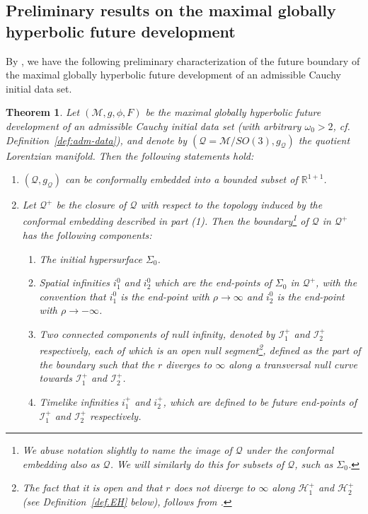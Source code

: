 \documentclass[10pt, reqno]{amsart}
\newtheorem{theorem}{Theorem}[section]
\theoremstyle{definition}
\theoremstyle{remark}
\theoremstyle{conjecture}
\numberwithin{equation}{section}
\newcommand{\0}{\emptyset}
\newcommand{\omg}{\omega}
\newcommand{\calH}{\mathcal H}
\newcommand{\calI}{\mathcal I}
\newcommand{\calM}{\mathcal M}
\newcommand{\calQ}{\mathcal Q}
\newcommand{\EH}{\calH^{+}}
\newcommand{\NI}{\calI^{+}}						%
\begin{document}
\subsection{Preliminary results on the maximal globally hyperbolic future development}\label{sec:MGHFD.prelim}
By \cite{Kommemi, D3}, we have the following preliminary characterization of the future boundary of the maximal globally hyperbolic future development of an admissible Cauchy initial data set.
\begin{theorem} \label{thm:kommemi}
Let $(\calM, g, \phi, F)$ be the maximal globally hyperbolic future development of an admissible Cauchy initial data set (with arbitrary $\omg_{0}>2$, cf. Definition~\ref{def:adm-data}), and denote by $(\calQ = \calM / SO(3), g_{\calQ})$ the quotient Lorentzian manifold. Then the following statements hold:
\begin{enumerate}
\item $(\mathcal Q,g_{\mathcal Q})$ can be conformally embedded into a bounded subset of $\mathbb R^{1+1}$. 
\item Let $\mathcal Q^+$ be the closure of $\mathcal Q$ with respect to the topology induced by the conformal embedding described in part (1). Then the boundary\footnote{We abuse notation slightly to name the image of $\mathcal Q$ under the conformal embedding also as $\mathcal Q$. We will similarly do this for subsets of $\mathcal Q$, such as $\Sigma_{0}$.} of $\mathcal Q$ in $\mathcal Q^+$ has the following components: 
\begin{enumerate}
\item The initial hypersurface $\Sigma_{0}$.
\item Spatial infinities $i^0_1$ and $i^0_2$ which are the end-points of $\Sigma_{0}$ in $\mathcal Q^+$, with the convention that $i^0_1$ is the end-point with $\rho\to \infty$ and $i^0_2$ is the end-point with $\rho\to -\infty$.
\item Two connected components of null infinity, denoted by $\mathcal I^+_1$ and $\mathcal I^+_2$ respectively, each of which is an open null segment\footnote{The fact that it is open and that $r$ does not diverge to $\infty$ along $\EH_1$ and $\EH_2$ (see Definition~\ref{def.EH} below), follows from \cite{DafTrapped}.}, defined as the part of the boundary such that the $r$ diverges to $\infty$ along a transversal null curve towards $\mathcal I^+_1$ and $\NI_2$. 
\item Timelike infinities $i^+_1$ and $i^+_2$, which are defined to be future end-points of $\mathcal I^+_1$ and $\mathcal I^+_2$ respectively.

\end{enumerate}
\end{enumerate}
\end{theorem}
\end{document}

